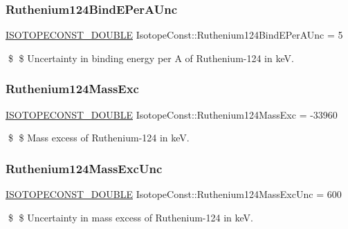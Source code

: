 \subsubsection{\texorpdfstring{Ruthenium124\+Bind\+E\+Per\+A\+Unc}{Ruthenium124BindEPerAUnc}}
{\footnotesize\ttfamily \mbox{\hyperlink{group___isotope_const-_macros_ga8f45a7272ce02c0b4c65c44636ed719a}{I\+S\+O\+T\+O\+P\+E\+C\+O\+N\+S\+T\+\_\+\+D\+O\+U\+B\+LE}} Isotope\+Const\+::\+Ruthenium124\+Bind\+E\+Per\+A\+Unc = 5}

\$ \$ Uncertainty in binding energy per A of Ruthenium-\/124 in keV. \mbox{\label{group___isotope_const-_ruthenium-_ru124_ga38f24c030425b64ac26f88bc95dd68eb}} 
\subsubsection{\texorpdfstring{Ruthenium124\+Mass\+Exc}{Ruthenium124MassExc}}
{\footnotesize\ttfamily \mbox{\hyperlink{group___isotope_const-_macros_ga8f45a7272ce02c0b4c65c44636ed719a}{I\+S\+O\+T\+O\+P\+E\+C\+O\+N\+S\+T\+\_\+\+D\+O\+U\+B\+LE}} Isotope\+Const\+::\+Ruthenium124\+Mass\+Exc = -\/33960}

\$ \$ Mass excess of Ruthenium-\/124 in keV. \mbox{\label{group___isotope_const-_ruthenium-_ru124_gad06f5f241568c32bde6b58aafd143de0}} 
\subsubsection{\texorpdfstring{Ruthenium124\+Mass\+Exc\+Unc}{Ruthenium124MassExcUnc}}
{\footnotesize\ttfamily \mbox{\hyperlink{group___isotope_const-_macros_ga8f45a7272ce02c0b4c65c44636ed719a}{I\+S\+O\+T\+O\+P\+E\+C\+O\+N\+S\+T\+\_\+\+D\+O\+U\+B\+LE}} Isotope\+Const\+::\+Ruthenium124\+Mass\+Exc\+Unc = 600}

\$ \$ Uncertainty in mass excess of Ruthenium-\/124 in keV. \mbox{\label{group___isotope_const-_ruthenium-_ru124_ga606417a0e837a70e008f95e4cfc8e096}} 
